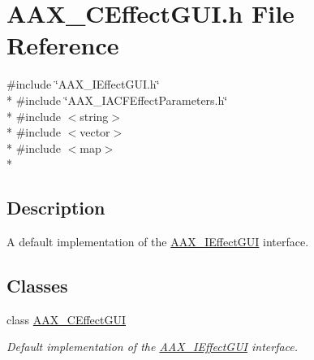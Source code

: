 \hypertarget{a00171}{}\section{A\+A\+X\+\_\+\+C\+Effect\+G\+U\+I.\+h File Reference}
\label{a00171}
{\ttfamily \#include \char`\"{}A\+A\+X\+\_\+\+I\+Effect\+G\+U\+I.\+h\char`\"{}}\\*
{\ttfamily \#include \char`\"{}A\+A\+X\+\_\+\+I\+A\+C\+F\+Effect\+Parameters.\+h\char`\"{}}\\*
{\ttfamily \#include $<$string$>$}\\*
{\ttfamily \#include $<$vector$>$}\\*
{\ttfamily \#include $<$map$>$}\\*


\subsection{Description}
A default implementation of the \hyperlink{a00098}{A\+A\+X\+\_\+\+I\+Effect\+G\+U\+I} interface. 

\subsection*{Classes}
\begin{DoxyCompactItemize}
\item 
class \hyperlink{a00017}{A\+A\+X\+\_\+\+C\+Effect\+G\+U\+I}
\begin{DoxyCompactList}\small\item\em Default implementation of the \hyperlink{a00098}{A\+A\+X\+\_\+\+I\+Effect\+G\+U\+I} interface. \end{DoxyCompactList}\end{DoxyCompactItemize}
